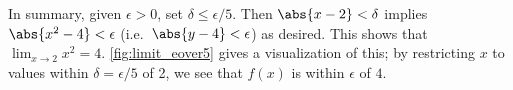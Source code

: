 {In summary, given $\epsilon > 0$, set $\delta\leq\epsilon/5$.  Then $\abs{x - 2} < \delta$ implies 
$\abs{x^2 - 4}< \epsilon$ (i.e.\ $\abs{y - 4}< \epsilon$) as desired.  This shows that $\displaystyle \lim_{x\rightarrow 2} x^2 = 4 $. \autoref{fig:limit_eover5} gives a visualization of this; by restricting $x$ to values within $\delta = \epsilon/5$ of 2, we see that $f(x)$ is within $\epsilon$ of $4$.}

%
%
%
%
